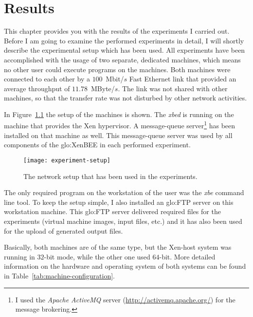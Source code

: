 
\chapter{Results}
\label{cha:results}

This chapter  provides you with the  results of the  experiments I carried
out. Before I  am going to examine the performed  experiments in detail, I
will shortly  describe the  experimental setup which  has been  used.  All
experiments  have  been  accomplished  with  the usage  of  two  separate,
dedicated machines,  which means no  other user could execute  programs on
the  machines.   Both   machines  were  connected  to  each   other  by  a
$100$~Mbit/$s$ Fast  Ethernet link that provided an  average throughput of
$11.78$~MByte/$s$. The  link was not  shared with other machines,  so that
the transfer rate was not disturbed by other network activities.

In  Figure~\ref{fig:experiment-setup}   the  setup  of   the  machines  is
shown. The  \emph{xbed} is  running on the  machine that provides  the Xen
hypervisor.   A  message-queue  server\footnote{I  used  the  \emph{Apache
    ActiveMQ}  server (\url{http://activemq.apache.org/}) for  the message
  brokering.}   has  been  installed   on  that  machine  as  well.   This
message-queue server was used by all components of the \gls{glo:XenBEE} in
each performed experiment.

\begin{figure}[ht]
  \centering
  \texttt{[image: experiment-setup]}
  \caption[Experimental setup]{The network setup that has been used in the
    experiments.}
  \label{fig:experiment-setup}
\end{figure}

The  only  required  program  on  the  workstation of  the  user  was  the
\emph{xbe} command line tool.  To  keep the setup simple, I also installed
an \gls{glo:FTP}  server on this workstation  machine.  This \gls{glo:FTP}
server delivered  required files for the experiments  (\ie virtual machine
images, input  files, etc.) and  it has also  been used for the  upload of
generated output files.

Basically, both machines are of the same type, but the Xen-host system was
running  in  $32$-bit mode,  while  the  other  one used  $64$-bit.   More
detailed information on the hardware  and operating system of both systems
can be found in Table~\ref{tab:machine-configuration}.

